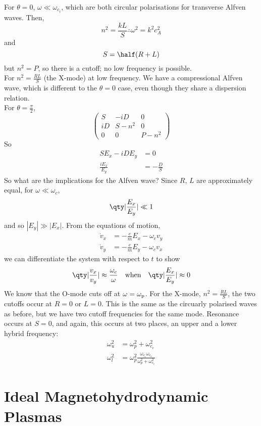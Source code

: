 \documentclass{book}         		                %
\begin{document}
For $\theta = 0$, $\omega \ll \omega_{c_i}$, which are both circular polarisations for transverse Alfven waves. Then, 
\[ n^2 = \frac{kL}{S} \therefore \omega^2 = k^2 c_A^2 \]
and 
\[ S = \half (R+L) \]
but $n^2 = P$, so there is a cutoff; no low frequency is possible.\\
For $n^2 = \frac{RL}{S}$ (the X-mode) at low frequency.  We have a
compressional Alfven wave, which is different to the $\theta=0$ case,
even though they share a dispersion relation.\\
For $\theta=\frac{\pi}{2}$,
\begin{equation*}
  \begin{pmatrix}
    S & -iD & 0 \\
iD & S-n^2 & 0 \\
0 & 0 & P-n^2
  \end{pmatrix}
\end{equation*}
So
\begin{align*}
  S E_x - iD E_y & = 0 \\
 \frac{i E_x}{E_y} &= - \frac{D}{S}
\end{align*}
So what are the implications for the Alfven wave? Since $R$, $L$ are approximately equal, for $\omega \ll \omega_c$,
\[ \qty|\frac{E_x}{E_y}| \ll 1 \]
and so $|E_y| \gg |E_x|$. From the equations of motion, 
\begin{align*} 
\dot{v}_x &= - \frac{e}{m} E_x - \omega_c v_y \\
\dot{v}_y &= - \frac{e}{m} E_y - \omega_c v_x
\end{align*}
we can differentiate the system with respect to $t$ to show
\begin{equation*}
  \qty| \frac{v_x}{v_y} | \approx \frac{\omega_c}{\omega} \quad \text{when}\quad \qty| \frac{E_x}{E_y} | \approx 0
\end{equation*}
We know that the O-mode cuts off at $\omega=\omega_{\rm p}$. For the
X-mode, $n^2= \frac{RL}{S}$, the two cutoffs occur at $R=0$ or
$L=0$. This is the same as the circuarly polarised waves as before,
but we have two cutoff frequencies for the same mode.  Resonance
occurs at $S=0$, and again, this occurs at two places, an upper and a
lower hybrid frequency:
\begin{align*}
  \omega_u^2 &= \omega_p^2 + \omega_{c_e}^2 \\
\omega_l^2 &= \omega_p^2 \frac{\omega_{c_i}\omega_{c_e}}{\omega_p^2+\omega_{c_e}^2}
\end{align*}

\section{Ideal Magnetohydrodynamic Plasmas}
\label{sec:idealmhd}
\end{document}

